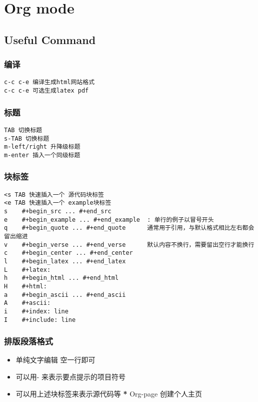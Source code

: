 \documentclass[11pt]{article}
\begin{document}
\section{Org mode}
\label{sec:org8a3b66f}
\subsection{Useful Command}
\label{sec:org4bca0dc}
\subsubsection{编译}
\label{sec:orga1a4d2d}
\begin{verbatim}
c-c c-e 编译生成html网站格式
c-c c-e 可选生成latex pdf
\end{verbatim}
\subsubsection{标题}
\label{sec:org3a59570}
\begin{verbatim}
TAB 切换标题
s-TAB 切换标题
m-left/right 升降级标题
m-enter 插入一个同级标题
\end{verbatim}
\subsubsection{块标签}
\label{sec:org0e10d9e}
\begin{verbatim}
<s TAB 快速插入一个 源代码块标签
<e TAB 快速插入一个 example块标签
s    #+begin_src ... #+end_src   
e    #+begin_example ... #+end_example  : 单行的例子以冒号开头  
q    #+begin_quote ... #+end_quote      通常用于引用，与默认格式相比左右都会留出缩进  
v    #+begin_verse ... #+end_verse      默认内容不换行，需要留出空行才能换行  
c    #+begin_center ... #+end_center   
l    #+begin_latex ... #+end_latex   
L    #+latex:   
h    #+begin_html ... #+end_html   
H    #+html:   
a    #+begin_ascii ... #+end_ascii   
A    #+ascii:   
i    #+index: line   
I    #+include: line 
\end{verbatim}
\subsubsection{排版段落格式}
\label{sec:orgfb991fa}
\begin{itemize}
\item 单纯文字编辑 空一行即可
\item 可以用- 来表示要点提示的项目符号
\item 可以用上述块标签来表示源代码等
\textbf{*} Org-page 创建个人主页
\end{itemize}
\end{document}
